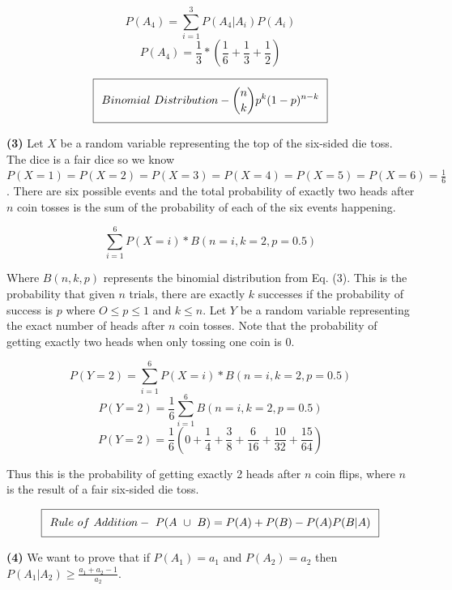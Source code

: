 \documentclass[11pt]{article}
\renewcommand\part[1]{\vspace{.10in}\textbf{(#1)}}
\begin{document}
$$P(A_4) = \sum_{i = 1}^3 P(A_4 | A_i)P(A_i)$$
$$P(A_4) = \frac{1}{3} * (\frac{1}{6} + \frac{1}{3} + \frac{1}{2})$$

\begin{equation}
\setlength\fboxsep{0.25cm}
\setlength\fboxrule{0.4pt}
\boxed{Binomial \ Distribution-  {n \choose k}p^k(1-p)^{n-k}}
\end{equation} 

\part{3} Let $X$ be a random variable representing the top of the six-sided die toss. The dice is a fair dice so we know $P(X=1) = P(X=2) = P(X=3) = P(X=4) = P(X=5) = P(X=6) = \frac{1}{6}$. There are six possible events and the total probability of exactly two heads after $n$ coin tosses is the sum of the probability of each of the six events happening. 

$$\sum_{i = 1}^6 P(X=i) * B(n = i, k = 2, p = 0.5)$$

Where $B(n, k, p)$ represents the binomial distribution from Eq. (3). This is the probability that given $n$ trials, there are exactly $k$ successes if the probability of success is $p$ where $O \leq p \leq 1$ and $k \leq n$. Let $Y$ be a random variable representing the exact number of heads after $n$ coin tosses. Note that the probability of getting exactly two heads when only tossing one coin is 0.

$$P(Y = 2) = \sum_{i = 1}^6 P(X=i) * B(n = i, k = 2, p = 0.5)$$
$$P(Y = 2) = \frac{1}{6}\sum_{i = 1}^6 B(n = i, k = 2, p = 0.5)$$
$$P(Y = 2) = \frac{1}{6}(0 + \frac{1}{4} + \frac{3}{8} + \frac{6}{16} + \frac{10}{32} + \frac{15}{64})$$

Thus this is the probability of getting exactly 2 heads after $n$ coin flips, where $n$ is the result of a fair six-sided die toss.

\begin{equation}
\setlength\fboxsep{0.25cm}
\setlength\fboxrule{0.4pt}
\boxed{Rule \ of \ Addition- \ P(A \ \cup \ B) = P(A) + P(B) - P(A)P(B|A)}
\end{equation} 

\part{4} We want to prove that if $P(A_1) = a_1$ and $P(A_2) = a_2$ then $P(A_1|A_2) \geq \frac{a_1 + a_2 -1}{a_2}$.
\end{document}
